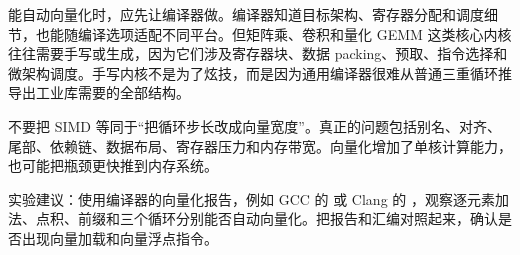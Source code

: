 能自动向量化时，应先让编译器做。编译器知道目标架构、寄存器分配和调度细节，也能随编译选项适配不同平台。但矩阵乘、卷积和量化 GEMM 这类核心内核往往需要手写或生成，因为它们涉及寄存器块、数据 packing、预取、指令选择和微架构调度。手写内核不是为了炫技，而是因为通用编译器很难从普通三重循环推导出工业库需要的全部结构。

\begin{warningbox}
不要把 SIMD 等同于“把循环步长改成向量宽度”。真正的问题包括别名、对齐、尾部、依赖链、数据布局、寄存器压力和内存带宽。向量化增加了单核计算能力，也可能把瓶颈更快推到内存系统。
\end{warningbox}

\begin{labbox}
实验建议：使用编译器的向量化报告，例如 GCC 的  或 Clang 的 ，观察逐元素加法、点积、前缀和三个循环分别能否自动向量化。把报告和汇编对照起来，确认是否出现向量加载和向量浮点指令。
\end{labbox}
